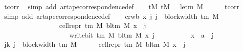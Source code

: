 \begin{isabellebody}
\ tcorr\ \isamarkupfalse%
\ {\isacharparenleft}{\kern0pt}simp\ add{\isacharcolon}{\kern0pt}\ ar{\isacharunderscore}{\kern0pt}tape{\isacharunderscore}{\kern0pt}correspondence{\isacharunderscore}{\kern0pt}def{\isacharparenright}{\kern0pt}\isanewline
\ \ \isamarkupfalse%
\ tM{}{\isacharcolon}{\kern0pt}\ {\isachardoublequoteopen}tM\ {}\ {\isacharequal}{\kern0pt}\ le{\isacharunderscore}{\kern0pt}tm\ M{\isachardoublequoteclose}\isanewline
\ \ \ \ \isamarkupfalse%
\ tcorr\ \isamarkupfalse%
\ {\isacharparenleft}{\kern0pt}simp\ add{\isacharcolon}{\kern0pt}\ ar{\isacharunderscore}{\kern0pt}tape{\isacharunderscore}{\kern0pt}correspondence{\isacharunderscore}{\kern0pt}def{\isacharparenright}{\kern0pt}\isanewline
\ \ \isamarkupfalse%
\ cr{\isacharunderscore}{\kern0pt}wb{\isacharcolon}{\kern0pt}\ {\isachardoublequoteopen}{\isasymAnd}x\ j{\isachardot}{\kern0pt}\ j\ {\isacharless}{\kern0pt}\ block{\isacharunderscore}{\kern0pt}width\ {\isacharparenleft}{\kern0pt}{\isasymGamma}{\isacharunderscore}{\kern0pt}tm\ M{\isacharparenright}{\kern0pt}\ {\isasymLongrightarrow}\isanewline
\ \ \ \ \ \ \ \ \ \ \ \ \ \ \ \ \ cell{\isacharunderscore}{\kern0pt}repr\ {\isacharparenleft}{\kern0pt}{\isasymGamma}{\isacharunderscore}{\kern0pt}tm\ M{\isacharparenright}{\kern0pt}\ {\isacharparenleft}{\kern0pt}bl{\isacharunderscore}{\kern0pt}tm\ M{\isacharparenright}{\kern0pt}\ x\ {\isacharbang}{\kern0pt}\ j\isanewline
\ \ \ \ \ \ \ \ \ \ \ \ \ \ \ \ \ \ \ {\isacharequal}{\kern0pt}\ write{\isacharunderscore}{\kern0pt}bit\ {\isacharparenleft}{\kern0pt}{\isasymGamma}{\isacharunderscore}{\kern0pt}tm\ M{\isacharparenright}{\kern0pt}\ {\isacharparenleft}{\kern0pt}bl{\isacharunderscore}{\kern0pt}tm\ M{\isacharparenright}{\kern0pt}\ x\ j{\isachardoublequoteclose}\isanewline
\ \ \isamarkupfalse%
\ {\isacharminus}{\kern0pt}\isanewline
\ \ \ \ \isamarkupfalse%
\ x\ {\isacharcolon}{\kern0pt}{\isacharcolon}{\kern0pt}\ {\isacharprime}{\kern0pt}a\ \ j\isanewline
\ \ \ \ \isamarkupfalse%
\ jk{\isacharcolon}{\kern0pt}\ {\isachardoublequoteopen}j\ {\isacharless}{\kern0pt}\ block{\isacharunderscore}{\kern0pt}width\ {\isacharparenleft}{\kern0pt}{\isasymGamma}{\isacharunderscore}{\kern0pt}tm\ M{\isacharparenright}{\kern0pt}{\isachardoublequoteclose}\isanewline
\ \ \ \ \isamarkupfalse%
\ {\isachardoublequoteopen}cell{\isacharunderscore}{\kern0pt}repr\ {\isacharparenleft}{\kern0pt}{\isasymGamma}{\isacharunderscore}{\kern0pt}tm\ M{\isacharparenright}{\kern0pt}\ {\isacharparenleft}{\kern0pt}bl{\isacharunderscore}{\kern0pt}tm\ M{\isacharparenright}{\kern0pt}\ x\ {\isacharbang}{\kern0pt}\ j\isanewline

\end{isabellebody}

